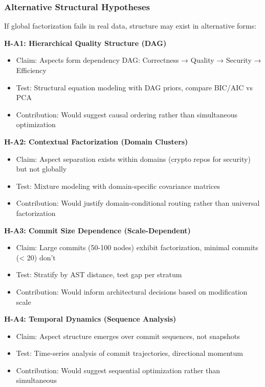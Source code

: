 \subsubsection{Alternative Structural Hypotheses}

If global factorization fails in real data, structure may exist in alternative forms:

\textbf{H-A1: Hierarchical Quality Structure (DAG)}
\begin{itemize}
\item Claim: Aspects form dependency DAG: Correctness → Quality → Security → Efficiency
\item Test: Structural equation modeling with DAG priors, compare BIC/AIC vs PCA
\item Contribution: Would suggest causal ordering rather than simultaneous optimization
\end{itemize}

\textbf{H-A2: Contextual Factorization (Domain Clusters)}
\begin{itemize}
\item Claim: Aspect separation exists within domains (crypto repos for security) but not globally
\item Test: Mixture modeling with domain-specific covariance matrices
\item Contribution: Would justify domain-conditional routing rather than universal factorization
\end{itemize}

\textbf{H-A3: Commit Size Dependence (Scale-Dependent)}
\begin{itemize}
\item Claim: Large commits (50-100 nodes) exhibit factorization, minimal commits (< 20) don't
\item Test: Stratify by AST distance, test gap per stratum
\item Contribution: Would inform architectural decisions based on modification scale
\end{itemize}

\textbf{H-A4: Temporal Dynamics (Sequence Analysis)}
\begin{itemize}
\item Claim: Aspect structure emerges over commit sequences, not snapshots
\item Test: Time-series analysis of commit trajectories, directional momentum
\item Contribution: Would suggest sequential optimization rather than simultaneous
\end{itemize}

